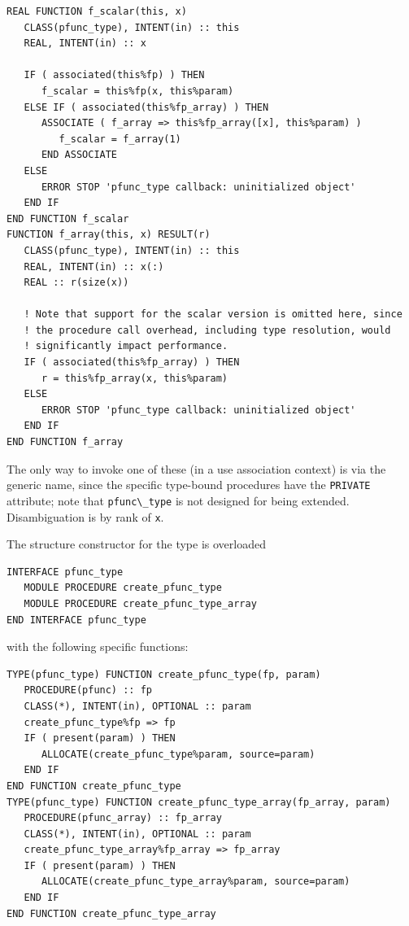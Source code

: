 \documentclass[
  paper=a4,
  ,captions=tableheading
]{scrartcl}
\newcommand{\passthrough}[1]{#1}
\begin{document}
\begin{lstlisting}
REAL FUNCTION f_scalar(this, x)
   CLASS(pfunc_type), INTENT(in) :: this
   REAL, INTENT(in) :: x

   IF ( associated(this%fp) ) THEN
      f_scalar = this%fp(x, this%param)
   ELSE IF ( associated(this%fp_array) ) THEN
      ASSOCIATE ( f_array => this%fp_array([x], this%param) )
         f_scalar = f_array(1)
      END ASSOCIATE
   ELSE
      ERROR STOP 'pfunc_type callback: uninitialized object'
   END IF
END FUNCTION f_scalar
FUNCTION f_array(this, x) RESULT(r)
   CLASS(pfunc_type), INTENT(in) :: this
   REAL, INTENT(in) :: x(:)
   REAL :: r(size(x))

   ! Note that support for the scalar version is omitted here, since
   ! the procedure call overhead, including type resolution, would
   ! significantly impact performance.
   IF ( associated(this%fp_array) ) THEN
      r = this%fp_array(x, this%param)
   ELSE
      ERROR STOP 'pfunc_type callback: uninitialized object'
   END IF
END FUNCTION f_array
\end{lstlisting}

The only way to invoke one of these (in a use association context) is
via the generic name, since the specific type-bound procedures have the
\passthrough{\lstinline!PRIVATE!} attribute; note that
\passthrough{\lstinline!pfunc\_type!} is not designed for being
extended. Disambiguation is by rank of \passthrough{\lstinline!x!}.

The structure constructor for the type is overloaded

\begin{lstlisting}
INTERFACE pfunc_type
   MODULE PROCEDURE create_pfunc_type
   MODULE PROCEDURE create_pfunc_type_array
END INTERFACE pfunc_type
\end{lstlisting}

with the following specific functions:

\begin{lstlisting}
TYPE(pfunc_type) FUNCTION create_pfunc_type(fp, param)
   PROCEDURE(pfunc) :: fp
   CLASS(*), INTENT(in), OPTIONAL :: param
   create_pfunc_type%fp => fp
   IF ( present(param) ) THEN
      ALLOCATE(create_pfunc_type%param, source=param)
   END IF
END FUNCTION create_pfunc_type
TYPE(pfunc_type) FUNCTION create_pfunc_type_array(fp_array, param)
   PROCEDURE(pfunc_array) :: fp_array
   CLASS(*), INTENT(in), OPTIONAL :: param
   create_pfunc_type_array%fp_array => fp_array
   IF ( present(param) ) THEN
      ALLOCATE(create_pfunc_type_array%param, source=param)
   END IF
END FUNCTION create_pfunc_type_array
\end{lstlisting}
\end{document}
